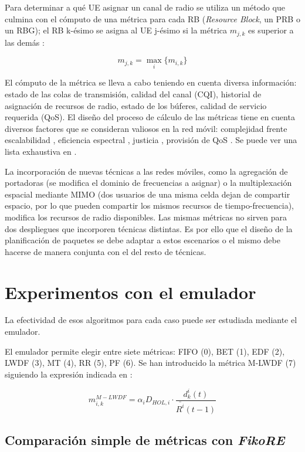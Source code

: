 \documentclass[12pt]{report} %
\begin{document}
Para determinar a qué UE asignar un canal de radio se utiliza un método que culmina con el cómputo de una métrica para cada RB (\textit{Resource Block}, un PRB o un RBG);
el RB k-ésimo se asigna al UE j-ésimo si la métrica $m_{j, k}$ es superior a las demás \cite{RefWorks:26}:

$$
m_{j, k} = \max_i \lbrace m_{i, k} \rbrace
$$


El cómputo de la métrica se lleva a cabo teniendo en cuenta diversa información:
estado de las colas de transmisión, calidad del canal (CQI), historial de asignación de recursos de radio, estado de los búferes, calidad de servicio requerida (QoS). \cite{RefWorks:26}
El diseño del proceso de cálculo de las métricas tiene en cuenta diversos factores que se consideran valiosos en la red móvil:
complejidad frente escalabilidad \cite{RefWorks:26},
eficiencia espectral \cite{RefWorks:26, RefWorks:64},
justicia \cite{RefWorks:26, RefWorks:63, RefWorks:65},
provisión de QoS \cite{RefWorks:26}.
Se puede ver una lista exhaustiva en \cite{RefWorks:26}.

La incorporación de nuevas técnicas a las redes móviles,
como la agregación de portadoras (se modifica el dominio de frecuencias a asignar) o la multiplexación espacial mediante MIMO (dos usuarios de una misma celda dejan de compartir espacio, por lo que pueden compartir los mismos recursos de tiempo-frecuencia),
modifica los recursos de radio disponibles.
Las mismas métricas no sirven para dos despliegues que incorporen técnicas distintas.
\cite{RefWorks:26}
Es por ello que el diseño de la planificación de paquetes se debe adaptar a estos escenarios o el mismo debe hacerse de manera conjunta con el del resto de técnicas.

\section{Experimentos con el emulador}

La efectividad de esos algoritmos para cada caso puede ser estudiada mediante el emulador.

El emulador permite elegir entre siete métricas: FIFO (0), BET (1), EDF (2), LWDF (3), MT (4), RR (5), PF (6).
Se han introducido la métrica M-LWDF (7) siguiendo la expresión indicada en \cite{RefWorks:26}:

$$
m_{i, k}^{M-LWDF} = \alpha_i D_{HOL, i} \cdot \frac {d_{k}^i (t)} {\bar{R^i} (t-1)}
$$

\subsection{Comparación simple de métricas con \textit{FikoRE}}
\end{document}
